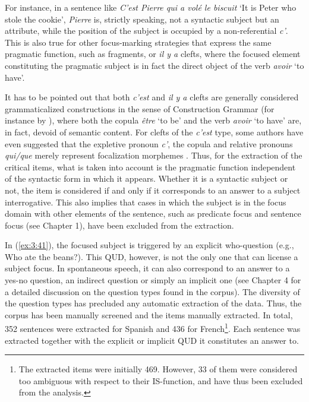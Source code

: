 For instance, in a sentence like \textit{C'est Pierre qui a volé le biscuit} `It is Peter who stole the cookie', \textit{Pierre} is, strictly speaking, not a syntactic subject but an attribute, while the position of the subject is occupied by a non-referential \textit{c'}. This is also true for other focus-marking strategies that express the same pragmatic function, such as fragments, or \textit{il y a} clefts, where the focused element constituting the pragmatic subject is in fact the direct object of the verb \textit{avoir} `to have'.

It has to be pointed out that both \textit{c'est} and \textit{il y a} clefts are generally considered grammaticalized constructions in the sense of Construction Grammar (for instance by \cite{lambrecht1996information}), where both the copula \textit{être} `to be' and the verb  \textit{avoir} `to have' are, in fact, devoid of semantic content. For clefts of the \textit{c'est} type, some authors have even suggested that the expletive pronoun \textit{c'}, the copula and relative pronouns \textit{qui/que} merely represent  focalization morphemes \parencite[197]{wehr2011phrase}. Thus, for the extraction of the critical items, what is taken into account is the pragmatic function independent of the syntactic form in which it appears. Whether it is a syntactic subject or not, the item is considered if and only if it corresponds to an answer to a subject interrogative.
This also implies that cases in which the subject is in the focus domain with other elements of the sentence, such as predicate focus and sentence focus (see Chapter 1), have been excluded from the extraction.

In (\ref{ex:3:41}), the focused subject is triggered by an explicit who-question (e.g., Who ate the beans?). This QUD, however, is not the only one that can license a subject focus. In spontaneous speech, it can also correspond to an answer to a yes-no question, an indirect question or simply an implicit one (see Chapter 4 for a detailed discussion on the question types found in the corpus). The diversity of the question types has precluded any automatic extraction of the data. Thus, the corpus has been manually screened and the items manually extracted. In total, 352 sentences were extracted for Spanish and 436 for French\footnote{The extracted items were initially 469. However, 33 of them were considered too ambiguous with respect to their IS-function, and have thus been excluded from the analysis.}. Each sentence was extracted together with the explicit or implicit QUD it constitutes an answer to. 


